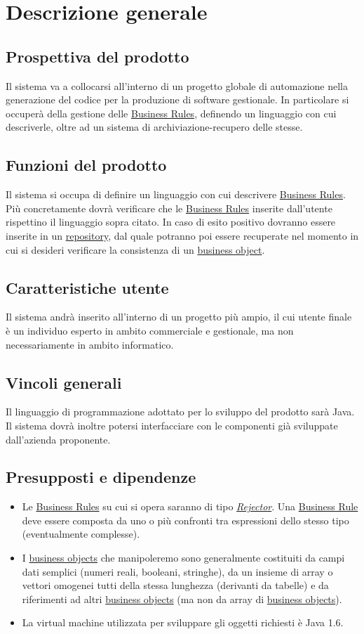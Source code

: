 \chapter{Descrizione generale}
\section{Prospettiva del prodotto}
Il sistema va a collocarsi all'interno di un progetto globale di automazione nella generazione del codice per la produzione di software gestionale. In particolare si occuper\`a della gestione delle \underline{Business Rules}, definendo un linguaggio con cui descriverle, oltre ad un sistema di archiviazione-recupero delle stesse.
\section{Funzioni del prodotto}
Il sistema si occupa di definire un linguaggio con cui descrivere \underline{Business Rules}. Pi\`u concretamente dovr\`a verificare che le \underline{Business Rules} inserite dall'utente rispettino il linguaggio sopra citato. In caso di esito positivo dovranno essere inserite in un \underline{repository}, dal quale potranno poi essere recuperate nel momento in cui si desideri verificare la consistenza di un \underline{business object}.
\section{Caratteristiche utente}
Il sistema andr\`a inserito all'interno di un progetto pi\`u ampio, il cui utente finale \`e un individuo esperto in ambito commerciale e gestionale, ma non necessariamente in ambito informatico.
\section{Vincoli generali}
Il linguaggio di programmazione adottato per lo sviluppo del prodotto sar\`a Java. Il sistema dovr\`a inoltre potersi interfacciare con le componenti gi\`a sviluppate dall'azienda proponente. 
\section{Presupposti e dipendenze}
\begin{itemize}
\item{Le \underline{Business Rules} su cui si opera saranno di tipo \textit{\underline{Rejector}}. Una \underline{Business Rule} deve essere composta da uno o pi\`u confronti tra espressioni dello stesso tipo (eventualmente complesse).}
\item{I \underline{business objects} che manipoleremo sono generalmente costituiti da campi dati semplici (numeri reali, booleani, stringhe), da un insieme di array o vettori omogenei tutti della stessa lunghezza (derivanti da tabelle) e da riferimenti ad altri \underline{business objects} (ma non da array di \underline{business objects}).
}
\item{La virtual machine utilizzata  per sviluppare gli oggetti richiesti \`e Java 1.6.}
\end{itemize}

